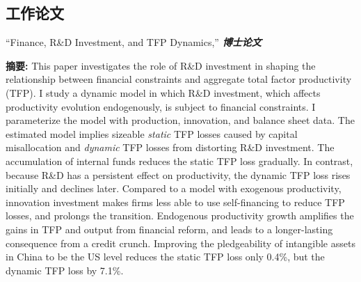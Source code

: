 \documentclass[letterpaper]{article}
\begin{document}
{\subsection*{\bf{工作论文}}
“Finance, R\&D Investment, and TFP Dynamics,” \textbf{\textit{博士论文}}
 \vspace{0.05in}
 \begin{center}
 \begin{minipage}{0.9\linewidth}
   \textbf{摘要:} This paper investigates the role of R\&D investment in shaping the relationship between financial constraints and aggregate total factor productivity (TFP). I study a dynamic model in which R\&D investment, which affects productivity evolution endogenously, is subject to financial constraints. I parameterize the model with production, innovation, and balance sheet data. The estimated model implies sizeable \textit{static} TFP losses caused by capital misallocation and \textit{dynamic} TFP losses from distorting R\&D investment. The accumulation of internal funds reduces the static TFP loss gradually. In contrast, because R\&D has a persistent effect on productivity, the dynamic TFP loss rises initially and declines later. Compared to a model with exogenous productivity, innovation investment makes firms less able to use self-financing to reduce TFP losses, and prolongs the transition. Endogenous productivity growth amplifies the gains in TFP and output from financial reform, and leads to a longer-lasting consequence from a credit crunch. Improving the pledgeability of intangible assets in China to be the US level reduces the static TFP loss only 0.4\%, but the dynamic TFP loss by 7.1\%.
 \end{minipage}
 \end{center}
 \vspace{0.05in}

}
\end{document}
